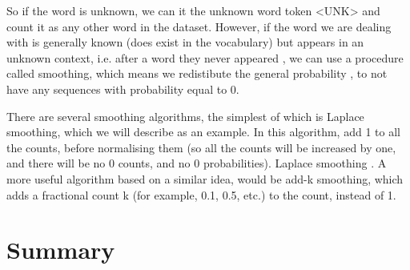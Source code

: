 So if the word is  unknown, we can  it  the unknown word token <UNK> and count it as any other word in the dataset. However, if the word we are dealing with is generally known (does exist in the vocabulary) but appears in an unknown context, i.e. after   a word they never appeared , we can use a procedure called smoothing, which means we redistibute the general probability , to not have any sequences with probability equal to 0. 

There are several smoothing algorithms, the simplest of which is Laplace smoothing, which we will describe as an example. In this algorithm,  add 1 to all the counts, before normalising them (so all the counts will be increased by one, and there will be no 0 counts, and no 0 probabilities).  Laplace smoothing  .  A more useful algorithm based on a similar idea, would be add-k smoothing, which adds a fractional count k (for example, 0.1, 0.5, etc.) to the count, instead of 1. 

\section{Summary}
\label{sec:NgramBackground-Summary}

